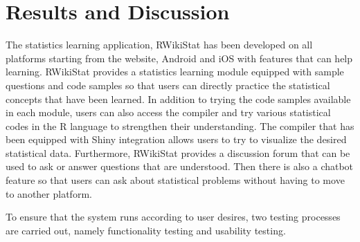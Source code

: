 \documentclass[conference,a4paper]{IEEEtran}
\begin{document}
\section{Results and Discussion}
\label{sect:results_discussion}

The statistics learning application, RWikiStat has been developed on all platforms starting from the website, Android and iOS with features that can help learning. RWikiStat provides a statistics learning module equipped with sample questions and code samples so that users can directly practice the statistical concepts that have been learned. In addition to trying the code samples available in each module, users can also access the compiler and try various statistical codes in the R language to strengthen their understanding. The compiler that has been equipped with Shiny integration allows users to try to visualize the desired statistical data. Furthermore, RWikiStat provides a discussion forum that can be used to ask or answer questions that are understood. Then there is also a chatbot feature so that users can ask about statistical problems without having to move to another platform.

To ensure that the system runs according to user desires, two testing processes are carried out, namely functionality testing and usability testing.
\end{document}
